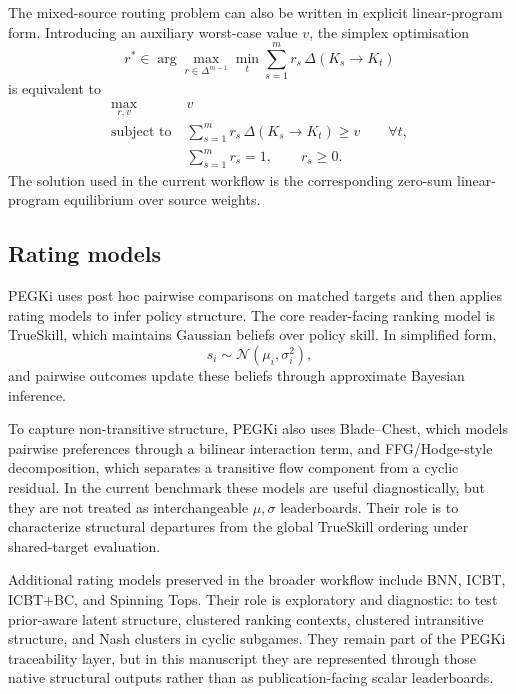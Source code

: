 \documentclass[twoside,twocolumn,9pt]{article}
\begin{document}
The mixed-source routing problem can also be written in explicit linear-program form. Introducing an auxiliary worst-case value $v$, the simplex optimisation
\[
r^\ast \in \arg\max_{r\in \Delta^{m-1}} \min_{t} \sum_{s=1}^{m} r_s\,\Delta(K_s\rightarrow K_t)
\]
is equivalent to
\[
\begin{aligned}
\max_{r,v}\;&v\\
\text{subject to}\;&\sum_{s=1}^{m} r_s\,\Delta(K_s\rightarrow K_t)\ge v
\qquad \forall t,\\
&\sum_{s=1}^{m}r_s=1,\qquad r_s\ge 0.
\end{aligned}
\]
The solution used in the current workflow is the corresponding zero-sum linear-program equilibrium over source weights.

\subsection{Rating models}

PEGKi uses post hoc pairwise comparisons on matched targets and then applies rating models to infer policy structure. The core reader-facing ranking model is TrueSkill, which maintains Gaussian beliefs over policy skill. In simplified form,
\[
s_i \sim \mathcal{N}(\mu_i,\sigma_i^2),
\]
and pairwise outcomes update these beliefs through approximate Bayesian inference.\cite{Herbrich2006TrueSkill,Minka2001EP}

To capture non-transitive structure, PEGKi also uses Blade--Chest, which models pairwise preferences through a bilinear interaction term, and FFG/Hodge-style decomposition, which separates a transitive flow component from a cyclic residual.\cite{ChenJoachims2016Intransitivity} In the current benchmark these models are useful diagnostically, but they are not treated as interchangeable $\mu,\sigma$ leaderboards. Their role is to characterize structural departures from the global TrueSkill ordering under shared-target evaluation.

Additional rating models preserved in the broader workflow include BNN, ICBT, ICBT+BC, and Spinning Tops. Their role is exploratory and diagnostic: to test prior-aware latent structure, clustered ranking contexts, clustered intransitive structure, and Nash clusters in cyclic subgames.\cite{Wellman2006EGTA,Balduzzi2019OpenEndedGames,Czarnecki2020SpinningTop} They remain part of the PEGKi traceability layer, but in this manuscript they are represented through those native structural outputs rather than as publication-facing scalar leaderboards.
\end{document}
